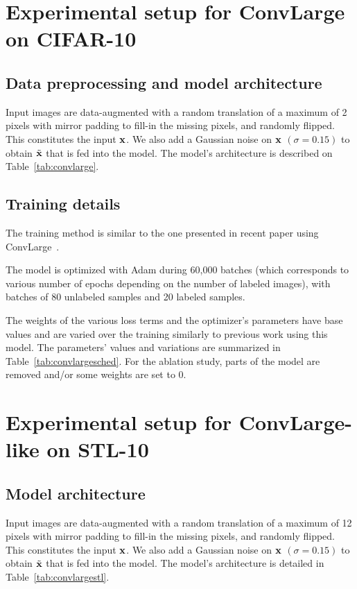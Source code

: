 \documentclass[runningheads]{llncs}
\begin{document}
\FloatBarrier

\section{Experimental setup for ConvLarge on CIFAR-10}
\subsection{Data preprocessing and model architecture}

Input images are data-augmented with a random translation of a maximum of 2 pixels with mirror padding to fill-in the missing pixels, and randomly flipped. This constitutes the input $\mathbf{x}$. We also add a Gaussian noise on $\mathbf{x}$ $(\sigma=0.15)$ to obtain $\tilde{\mathbf{x}}$ that is fed into the model.
The model's architecture is described on Table~\ref{tab:convlarge}.

\subsection{Training details}

The training method is similar to the one presented in recent paper using Conv\-Large~\cite{Sajjadi2016,Laine2016,Tarvainen2017}.

The model is optimized with Adam during 60,000 batches (which corresponds to various number of epochs depending on the number of labeled images), with batches of 80 unlabeled samples and 20 labeled samples.

The weights of the various loss terms and the optimizer's parameters have base values and are varied over the training similarly to previous work using this model. The parameters' values and variations are summarized in Table~\ref{tab:convlargesched}. For the ablation study, parts of the model are removed and/or some weights are set to 0.


\section{Experimental setup for ConvLarge-like on STL-10}
\subsection{Model architecture}

Input images are data-augmented with a random translation of a maximum of 12 pixels with mirror padding to fill-in the missing pixels, and randomly flipped. This constitutes the input $\mathbf{x}$. We also add a Gaussian noise on $\mathbf{x}$ $(\sigma=0.15)$ to obtain $\tilde{\mathbf{x}}$ that is fed into the model.
The model's architecture is detailed in Table~\ref{tab:convlargestl}.
\end{document}

